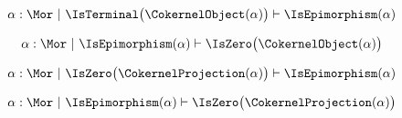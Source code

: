 \begin{sequent}
\begin{align*}
  \alpha: \Mor ~|~ \IsTerminal\big( \CokernelObject( \alpha ) \big) \vdash \IsEpimorphism( \alpha )
\end{align*}
\end{sequent}

\begin{sequent}
\begin{align*}
  \alpha: \Mor ~|~ \IsEpimorphism( \alpha ) \vdash \IsZero\big( \CokernelObject( \alpha ) \big)
\end{align*}
\end{sequent}

\begin{sequent}
\begin{align*}
  \alpha: \Mor ~|~ \IsZero\big( \CokernelProjection( \alpha ) \big) \vdash \IsEpimorphism( \alpha )
\end{align*}
\end{sequent}

\begin{sequent}
\begin{align*}
  \alpha: \Mor ~|~  \IsEpimorphism( \alpha ) \vdash \IsZero\big( \CokernelProjection( \alpha ) \big)
\end{align*}
\end{sequent}
